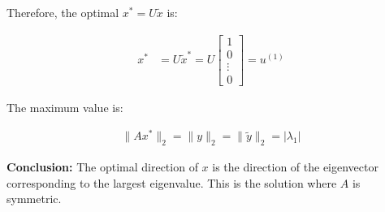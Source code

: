 \begin{derivation}
    Therefore, the optimal \( x^* = U \tilde{x}\) is:

    \begin{align*}
    x^* &= U \tilde{x}^* = U
    \begin{bmatrix} 1 \\ 0 \\ \vdots \\ 0 \end{bmatrix} = u^{(1)}
    \end{align*}

    The maximum value is:

    \begin{align*}
    \|A x^*\|_2 = \|y\|_2 = \| \tilde{y} \|_2 = |\lambda_1|
    \end{align*}

    \textbf{Conclusion:} The optimal direction of \( x \) is the direction of the eigenvector corresponding to the largest eigenvalue. This is the solution where $A$ is symmetric.
\end{derivation}

